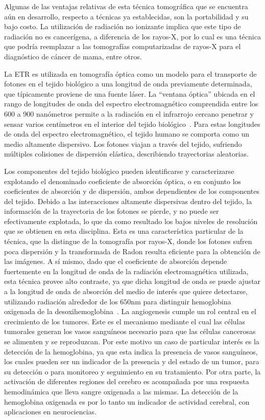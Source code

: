  Algunas de las ventajas relativas de esta técnica tomográfica que se encuentra aún en desarrollo, respecto a 
 técnicas ya establecidas, son la portabilidad y su bajo costo. 
 La utilización de radiación no 
 ionizante implica que este tipo de radiación no es cancerígena, a diferencia de los rayos-X, 
 por lo cual es una técnica que podría reemplazar a las tomografías 
 computarizadas de rayos-X para el diagnóstico de cáncer de mama, entre otros. 
 
 La ETR es utilizada 
 en tomografía óptica como
 un modelo para el transporte de fotones en el tejido biológico a una longitud de onda previamente determinada, 
 que típicamente proviene de una fuente láser.
 La ``ventana óptica'' ubicada en el rango de longitudes de onda del espectro electromagnético comprendida entre los 600 a 900 nanómetros permite a la radiación en el 
 infrarrojo cercano penetrar y sensar varios centímetros en el interior del tejido biológico~\cite{Boas2001}. 
 Para estas longitudes de onda del espectro electromagnético, el tejido humano se comporta 
 como un medio altamente dispersivo. Los fotones viajan a través del
 tejido, sufriendo múltiples colisiones de dispersión elástica, describiendo trayectorias 
aleatorias.

 Los componentes del tejido biológico pueden identificarse y caracterizarse
 explotando el denominado coeficiente de absorción óptica, o en conjunto 
 los coeficientes de absorción y de dispersión, ambos dependientes 
 de los componentes del tejido.
 Debido a las interacciones altamente dispersivas dentro del tejido,
 la información de la trayectoria de los fotones se pierde, y no puede ser efectivamente explotada,
 lo que da como resultado los bajos niveles de resolución que se obtienen en esta disciplina. 
 Esta es una característica particular de la técnica, que la distingue de la tomografía 
 por rayos-X, donde los fotones sufren poca dispersión y la transformada de 
Radon resulta eficiente para la obtención de las imágenes. A sí mismo, 
 dado que el coeficiente de absorción depende fuertemente en la longitud de onda 
 de la radiación electromagnética utilizada, esta técnica provee alto contraste, 
 ya que dicha longitud de onda se puede ajustar a la longitud de onda de absorción 
 del medio de interés que quiere detectarse, \eg utilizando radiación alrededor de los $650$nm 
 para distinguir hemoglobina oxigenada de la desoxihemoglobina~\cite{Boas2001}. La angiogenesis 
 cumple un rol central en el crecimiento de los tumores. Este es 
 el mecanismo mediante el cual las células tumorales generan los vasos sanguíneos 
 necesario para que las células cancerosas se alimenten y se reproduzcan. Por este 
 motivo un caso de particular interés es la detección de la hemoglobina, ya que esta indica la presencia de vasos sanguíneos, los cuales pueden ser un indicador de la presencia y del estado de un tumor, para su detección o para monitoreo y seguimiento en su tratamiento. 
 Por otra parte, 
 la activación de diferentes regiones del cerebro 
 es acompañada por una respuesta hemodinámica que lleva sangre oxigenada 
 a las mismas. La detección de la hemoglobina 
 oxigenada es por lo tanto un indicador de actividad cerebral, con aplicaciones 
 en neurociencias. 
 
